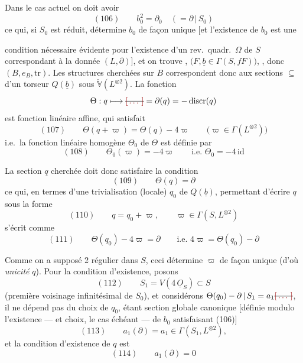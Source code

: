 \documentclass[11pt,a4paper]{article}
\begin{document}

Dans le cas actuel on doit avoir
\[
(106)\qquad b_0^2 = \partial_0 \quad (= \partial \,|\, S_0)
\]
ce qui, si $S_0$ est réduit, détermine $b_0$ de façon unique
[et l'existence de $b_0$ est une

condition nécessaire évidente pour l'existence d'un rev.\ quadr.\ $\Omega$ de $S$
correspondant à la donnée $(L, \partial)$], et on trouve , 
 $\bigl(F, \underline{b} \in \Gamma(S, fF)\bigr)$, ,
  donc $(B, e_B, \mathrm{tr})$. Les structures
  cherchées sur $B$ correspondent donc
aux sections   $\subseteq$ d'un torseur $Q(\underline{b})$
sous $\check{\mathbb{V}}(L^{\otimes 2})$.  La fonction \struck{\ill{}}
\[
\Theta : q \longmapsto \text{\struck{\ill{}}} = \partial(q) = -\operatorname{discr}(q)
\]
 
est   fonction linéaire affine, qui satisfait
\[
(107)\qquad \Theta(q + \varpi) = \Theta(q) - 4\varpi \qquad \bigl(\varpi \in \Gamma(L^{\otimes 2})\bigr)
\]
i.e.\ la fonction linéaire homogène $\Theta_0$ de $\Theta$ est définie par
\[
(108)\qquad \Theta_0(\varpi) = -4\varpi \qquad \text{i.e. } \Theta_0 = -4\, \mathrm{id}
\]

La section $q$ cherchée doit donc satisfaire la condition
\[
(109)\qquad \Theta(q) = \partial
\]
ce qui, en termes d'une trivialisation (locale) $q_0$ de $Q(\underline{b})$,
permettant d'écrire $q$ sous la forme
\[
(110)\qquad q = q_0 + \varpi, \qquad \varpi \in \Gamma(S, L^{\otimes 2})
\]
s'écrit comme
\[
(111)\qquad \Theta(q_0) - 4\varpi = \partial \qquad \text{i.e. } 4\varpi = \Theta(q_0) - \partial
\]

Comme on a supposé 2 régulier dans $S$, ceci  détermine $\varpi$ de
façon unique (d'où \emph{unicité}  $q$). Pour la condition d'existence,
posons
\[
(112)\qquad S_1 = V(4\,\underline{O}_S) \subset S
\]
(première voisinage infinitésimal de $S_0$), et considérons
$\Theta(q_0) - \partial \,|\, S_1 = a_1 \text{\struck{\ill{}}}$, il ne dépend pas du choix de $q_0$,
étant section globale canonique [définie modulo l'existence --- et choix, le cas échéant
--- de $b_0$ satisfaisant (106)]
\[
(113)\qquad a_1(\partial) = a_1 \in \Gamma(S_1, L^{\otimes 2}),
\]
et la condition  d'existence de $q$ est
\[
(114)\qquad a_1(\partial) = 0
\]
\end{document}
